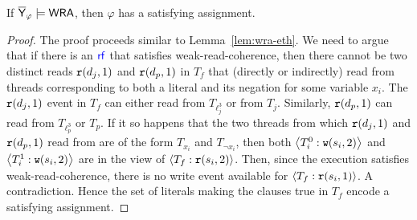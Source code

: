 \begin{lemma}
If  $\overline{\mathsf{\color{black}Y}}_\varphi \models \mathsf{WRA}$, then $\varphi$ has a satisfying assignment. 
\end{lemma}
\begin{proof}
The proof proceeds similar to Lemma~\ref{lem:wra-eth}. We need to argue that if there is an $\rf$ that satisfies weak-read-coherence, then there cannot be two distinct reads $\mathtt{r}(d_{j}, 1)$ and $\mathtt{r}(d_{p}, 1)$ in $T_f$ that (directly or indirectly) read from threads corresponding to both a literal and its negation for some variable $x_i$. The $\mathtt{r}(d_j, 1)$ event in $T_f$ can either read from  $T_{\ell_j^3}$ or from $T_{j}$. Similarly, $\mathtt{r}(d_p, 1)$ can read from $T_{\ell_p^3}$ or $T_p$. If it so happens that the two threads from which $\mathtt{r}(d_{j}, 1)$ and $\mathtt{r}(d_{p}, 1)$ read from are of the form $T_{x_i}$ and $T_{\neg x_i}$, then both $\left\langle T_i^0: \mathtt{w}(s_i, 2)\right\rangle$ and $\left\langle T_i^1: \mathtt{w}(s_i, 2)\right\rangle$ are in the view of $\left\langle T_f: \mathtt{r}(s_i, 2)\right\rangle$. Then, since the execution satisfies weak-read-coherence, there is no write event available for $\left\langle T_f: \mathtt{r}(s_i, 1)\right\rangle$. A contradiction. Hence the set of literals making the clauses true in $T_f$ encode a satisfying assignment. 
\end{proof}

